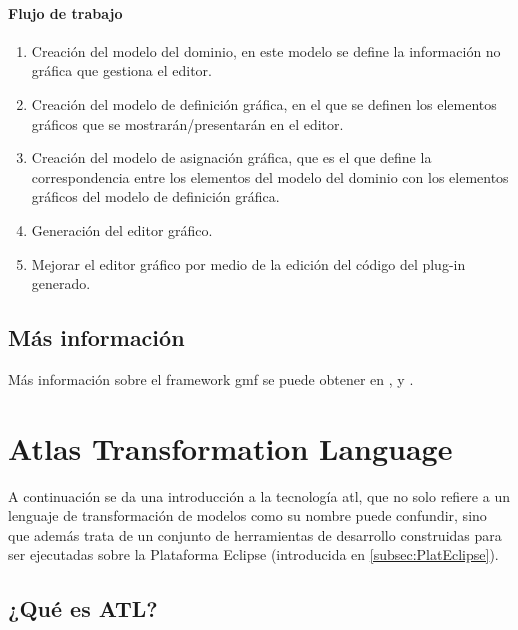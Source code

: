 \documentclass[a4paper,12pt,oneside,spanish]{book}
\begin{document}
\paragraph{Flujo de trabajo}

\begin{enumerate}


\item Creación del modelo del dominio, en este modelo se define la información no gráfica  que gestiona el editor.

\item Creación del modelo de definición gráfica, en el que se definen los elementos gráficos que se mostrarán/presentarán en el editor.

\item Creación del modelo de asignación gráfica, que es el que define la correspondencia entre los elementos del modelo del dominio con los elementos gráficos del modelo de definición gráfica.

\item Generación del editor gráfico.

\item Mejorar el editor gráfico por medio de la edición del código del plug-in generado.

\end{enumerate}


\subsection{Más información}

Más información sobre el framework \gls{gmf} se puede obtener en \cite{GMP}, \cite{IntroGMFRuntime} y \cite{GMFTutorial}.


\section{Atlas Transformation Language}

A continuación se da una introducción a la tecnología \gls{atl}, que no solo refiere a un lenguaje de transformación de modelos como su nombre puede confundir, sino que además trata de un conjunto de herramientas de desarrollo construidas para ser ejecutadas sobre la Plataforma Eclipse (introducida en \ref{subsec:PlatEclipse}).


\subsection{¿Qué es ATL?}
\end{document}
